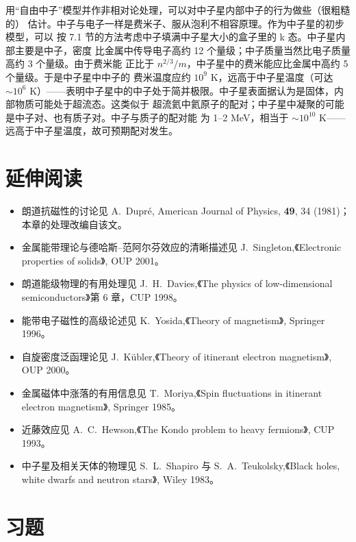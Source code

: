用“自由中子”模型并作非相对论处理，可以对中子星内部中子的行为做些（很粗糙的）
估计。中子与电子一样是费米子、服从泡利不相容原理。作为中子星的初步模型，可以
按 7.1 节的方法考虑中子填满中子星大小的盒子里的 k 态。中子星内部主要是中子，密度
比金属中传导电子高约 12 个量级；中子质量当然比电子质量高约 3 个量级。由于费米能
正比于 $n^{2/3}/m$，中子星中的费米能应比金属中高约 5 个量级。于是中子星中中子的
费米温度应约 $10^{9}$ K，远高于中子星温度（可达 $\sim10^{6}$ K）——表明中子星中的中子处于简并极限。中子星表面据认为是固体，内部物质可能处于超流态。这类似于
超流氦中氦原子的配对；中子星中凝聚的可能是中子对、也有质子对。中子与质子的配对能
为 1--2 MeV，相当于 $\sim10^{10}$ K——远高于中子星温度，故可预期配对发生。

\section*{延伸阅读}

\begin{itemize}[itemsep=0.2em]
\item 朗道抗磁性的讨论见 A.~Dupr\'{e}, American Journal of Physics, \textbf{49},
34 (1981)；本章的处理改编自该文。
\item 金属能带理论与德哈斯--范阿尔芬效应的清晰描述见 J.~Singleton,《Electronic
properties of solids》, OUP 2001。
\item 朗道能级物理的有用处理见 J.~H.~Davies,《The physics of low-dimensional
semiconductors》第 6 章，CUP 1998。
\item 能带电子磁性的高级论述见 K.~Yosida,《Theory of magnetism》, Springer 1996。
\item 自旋密度泛函理论见 J.~K\"{u}bler,《Theory of itinerant electron magnetism》,
OUP 2000。
\item 金属磁体中涨落的有用信息见 T.~Moriya,《Spin fluctuations in itinerant
electron magnetism》, Springer 1985。
\item 近藤效应见 A.~C.~Hewson,《The Kondo problem to heavy fermions》, CUP 1993。
\item 中子星及相关天体的物理见 S.~L.~Shapiro 与 S.~A.~Teukolsky,《Black holes,
white dwarfs and neutron stars》, Wiley 1983。
\end{itemize}

\section*{习题}

